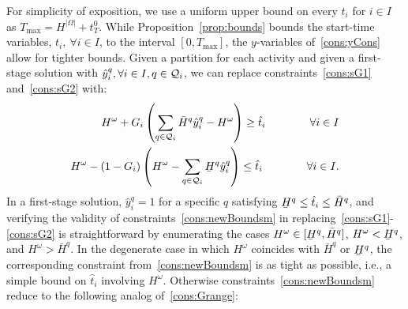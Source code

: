 \documentclass[11pt]{article}
\newcommand{\cQ}{{\cal Q}}
\newcommand{\noi}{\noindent}
\renewcommand{\underbar}{\underaccent{\bar}}
\begin{document}
	\noi For simplicity of exposition, we use a uniform upper bound on every \(t_i\) for \(i \in I\) as \(T_{\max} = H^{|\Omega|} + t_T^0\). While Proposition~\ref{prop:bounds} bounds the start-time variables, \(t_i,\ \forall i \in I\), to the interval \([0,T_{\max}]\),
	the $y$-variables of~\eqref{cons:yCons} allow for tighter bounds.   
	Given a partition for each activity and given a first-stage solution with \(\hat{y}_i^{q}, \forall i \in I, q \in \cQ_i \), we can replace 
	constraints~\eqref{cons:sG1} and~\eqref{cons:sG2} with:
	\begin{subequations} \label{cons:newBoundsm}
		\begin{align}
		H^\omega + G_i \left(\sum_{q \in \cQ_i} \bar{H}^q \hat{y}_i^q - H^\omega \right) \geq \hat{t}_i \qquad \qquad \forall i \in I\\
		H^\omega - (1 - G_i) \left(H^\omega - \sum_{q \in \cQ_i} \underbar{H}^q \hat{y}_i^q \right) \leq \hat{t}_i \qquad \qquad \forall i \in I.
		\end{align}
	\end{subequations}
	In a first-stage solution, $\hat{y}_i^q=1$ for a specific $q$ satisfying $\underbar{H}^{q} \le \hat{t}_i \le \bar{H}^{q}$, and verifying the validity of constraints~\eqref{cons:newBoundsm} in replacing~\eqref{cons:sG1}-\eqref{cons:sG2} is straightforward by enumerating the cases \(H^\omega \in [\underbar{H}^{{q}},\bar{H}^{{q}}]\), \(H^\omega < \underbar{H}^{{q}}\), and \(H^\omega > \bar{H}^{{q}}\). In the degenerate case in which $H^\omega$ coincides with $\bar{H}^q$ or $\underbar{H}^q$, the corresponding constraint from~\eqref{cons:newBoundsm} is as tight as possible, i.e., a simple bound on $\hat{t}_i$ involving $H^\omega$. Otherwise constraints~\eqref{cons:newBoundsm} reduce to the following analog of~\eqref{cons:Grange}:
\end{document}

